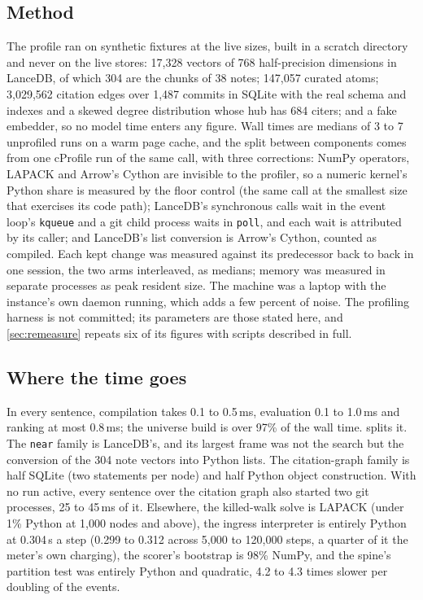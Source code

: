 \documentclass[11pt]{article}
\theoremstyle{plain}
\theoremstyle{definition}
\theoremstyle{remark}
\begin{document}
\subsection{Method}\label{sec:method}
The profile ran on synthetic fixtures at the live sizes, built in a scratch directory and never on
the live stores: 17{,}328 vectors of 768 half-precision dimensions in LanceDB, of which 304 are the
chunks of 38 notes; 147{,}057 curated atoms; 3{,}029{,}562 citation edges over 1{,}487 commits in
SQLite with the real schema and indexes and a skewed degree distribution whose hub has 684 citers;
and a fake embedder, so no model time enters any figure. Wall times are medians of 3 to 7
unprofiled runs on a warm page cache, and the split between components comes from one cProfile run
of the same call, with three corrections: NumPy operators, LAPACK and Arrow's Cython are invisible
to the profiler, so a numeric kernel's Python share is measured by the floor control (the same call
at the smallest size that exercises its code path); LanceDB's synchronous calls wait in the event
loop's \texttt{kqueue} and a git child process waits in \texttt{poll}, and each wait is attributed by
its caller; and LanceDB's list conversion is Arrow's Cython, counted as compiled. Each kept change
was measured against its predecessor back to back in one session, the two arms interleaved, as
medians; memory was measured in separate processes as peak resident size. The machine was a laptop
with the instance's own daemon running, which adds a few percent of noise. The profiling harness is
not committed; its parameters are those stated here, and \cref{sec:remeasure} repeats six of its
figures with scripts described in full.

\subsection{Where the time goes}\label{sec:profile}
In every sentence, compilation takes 0.1 to 0.5\,ms, evaluation 0.1 to 1.0\,ms and ranking at most
0.8\,ms; the universe build is over 97\% of the wall time.  splits it. The
\texttt{near} family is LanceDB's, and its largest frame was not the search but the conversion of
the 304 note vectors into Python lists. The citation-graph family is half SQLite (two statements
per node) and half Python object construction. With no run active, every sentence over the citation
graph also started two git processes, 25 to 45\,ms of it. Elsewhere, the killed-walk solve is
LAPACK (under 1\% Python at 1{,}000 nodes and above), the ingress interpreter is entirely Python at
0.304\,\textmu s a step (0.299 to 0.312 across 5{,}000 to 120{,}000 steps, a quarter of it the
meter's own charging), the scorer's bootstrap is 98\% NumPy, and the spine's partition test was
entirely Python and quadratic, 4.2 to 4.3 times slower per doubling of the events.
\end{document}
